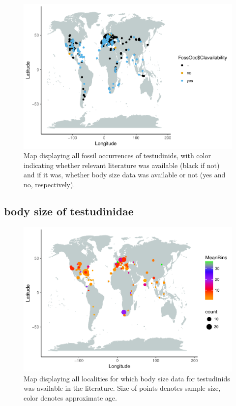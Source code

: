 \documentclass[]{article}
\begin{document}
\begin{figure}[htbp]
\centering
\includegraphics{MA_JJ_files/figure-latex/Map fossil occurrences-1.pdf}
\caption{Map displaying all fossil occurrences of testudinids, with
color indicating whether relevant literature was available (black if
not) and if it was, whether body size data was available or not (yes and
no, respectively).}
\end{figure}

\newpage

\subsection{body size of testudinidae}\label{body-size-of-testudinidae}

\begin{figure}[htbp]
\centering
\includegraphics{MA_JJ_files/figure-latex/Map body size data set-1.pdf}
\caption{Map displaying all localities for which body size data for
testudinids was available in the literature. Size of points denotes
sample size, color denotes approximate age.}
\end{figure}
\end{document}
